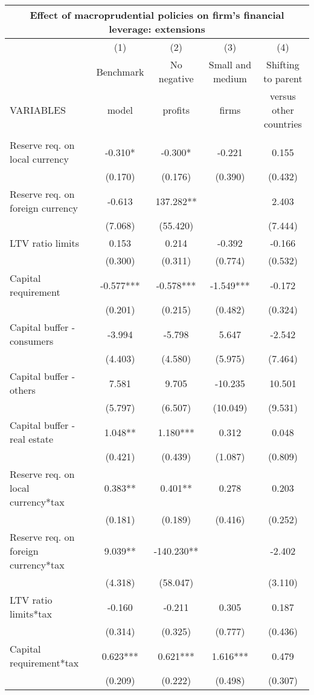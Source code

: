 \begin{tabular}{lcccc}
\multicolumn{5}{c}{Effect of macroprudential policies on firm's financial leverage: extensions} \\ \hline
 & (1) & (2) & (3) & (4) \\
 & Benchmark & No negative & Small and medium & Shifting to parent \\
VARIABLES & model & profits & firms & versus other countries \\ \hline
 &  &  &  &  \\
Reserve req. on local currency & -0.310* & -0.300* & -0.221 & 0.155 \\
 & (0.170) & (0.176) & (0.390) & (0.432) \\
Reserve req. on foreign currency & -0.613 & 137.282** &  & 2.403 \\
 & (7.068) & (55.420) &  & (7.444) \\
LTV ratio limits & 0.153 & 0.214 & -0.392 & -0.166 \\
 & (0.300) & (0.311) & (0.774) & (0.532) \\
Capital requirement & -0.577*** & -0.578*** & -1.549*** & -0.172 \\
 & (0.201) & (0.215) & (0.482) & (0.324) \\
Capital buffer - consumers & -3.994 & -5.798 & 5.647 & -2.542 \\
 & (4.403) & (4.580) & (5.975) & (7.464) \\
Capital buffer - others & 7.581 & 9.705 & -10.235 & 10.501 \\
 & (5.797) & (6.507) & (10.049) & (9.531) \\
Capital buffer - real estate & 1.048** & 1.180*** & 0.312 & 0.048 \\
 & (0.421) & (0.439) & (1.087) & (0.809) \\
Reserve req. on local currency*tax & 0.383** & 0.401** & 0.278 & 0.203 \\
 & (0.181) & (0.189) & (0.416) & (0.252) \\
Reserve req. on foreign currency*tax & 9.039** & -140.230** &  & -2.402 \\
 & (4.318) & (58.047) &  & (3.110) \\
LTV ratio limits*tax & -0.160 & -0.211 & 0.305 & 0.187 \\
 & (0.314) & (0.325) & (0.777) & (0.436) \\
Capital requirement*tax & 0.623*** & 0.621*** & 1.616*** & 0.479 \\
 & (0.209) & (0.222) & (0.498) & (0.307) \\

\end{tabular}
